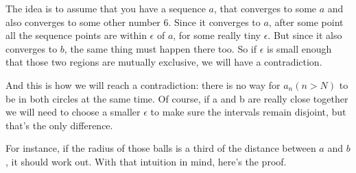 \documentclass[11pt,twoside=off,numbers=noenddot]{scrbook}
\begin{document}
\begin{proofidea}
  The idea is to assume that you have a sequence $a$, that converges
  to some $a$ and also converges to some other number 6. Since it
  converges to $a$, after some point all the sequence points are
  within $\epsilon$ of $a$, for some really tiny $\epsilon$. But
  since it also converges to $b$, the same thing must happen there
  too. So if $\epsilon$ is small enough that those two regions are
  mutually exclusive, we will have a contradiction.

  \begin{tightfigure}
    \centering
  \end{tightfigure}

  And this is how we will reach a contradiction: there is no way for
  $a_n (n > N)$ to be in both circles at the same time. Of course, if
  a and b are really close together we will need to choose a smaller
  $\epsilon$ to make sure the intervals remain disjoint, but that's
  the only difference.

  \begin{tightfigure}
    \centering
  \end{tightfigure}

  For instance, if the radius of those balls is a third of the
  distance between $a$ and $b$, it should work out. With that
  intuition in mind, here's the proof.
\end{proofidea}
\end{document}
